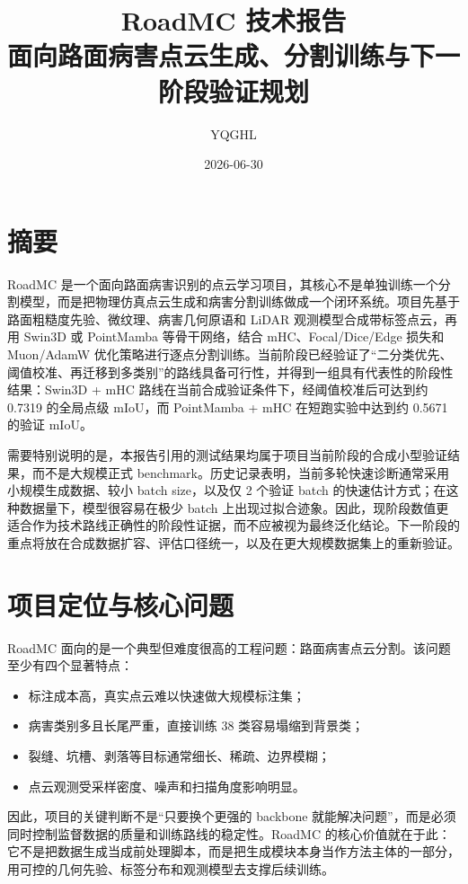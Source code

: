 \documentclass[12pt]{ctexart}
\title{\textbf{RoadMC 技术报告}\\
\large 面向路面病害点云生成、分割训练与下一阶段验证规划}
\author{YQGHL}
\date{2026-06-30}
\begin{document}
\maketitle

\section*{摘要}

RoadMC 是一个面向路面病害识别的点云学习项目，其核心不是单独训练一个分割模型，而是把物理仿真点云生成和病害分割训练做成一个闭环系统。项目先基于路面粗糙度先验、微纹理、病害几何原语和 LiDAR 观测模型合成带标签点云，再用 Swin3D 或 PointMamba 等骨干网络，结合 mHC、Focal/Dice/Edge 损失和 Muon/AdamW 优化策略进行逐点分割训练。当前阶段已经验证了“二分类优先、阈值校准、再迁移到多类别”的路线具备可行性，并得到一组具有代表性的阶段性结果：Swin3D + mHC 路线在当前合成验证条件下，经阈值校准后可达到约 0.7319 的全局点级 mIoU，而 PointMamba + mHC 在短跑实验中达到约 0.5671 的验证 mIoU。

需要特别说明的是，本报告引用的测试结果均属于项目当前阶段的合成小型验证结果，而不是大规模正式 benchmark。历史记录表明，当前多轮快速诊断通常采用小规模生成数据、较小 batch size，以及仅 2 个验证 batch 的快速估计方式；在这种数据量下，模型很容易在极少 batch 上出现过拟合迹象。因此，现阶段数值更适合作为技术路线正确性的阶段性证据，而不应被视为最终泛化结论。下一阶段的重点将放在合成数据扩容、评估口径统一，以及在更大规模数据集上的重新验证。

\section{项目定位与核心问题}

RoadMC 面向的是一个典型但难度很高的工程问题：路面病害点云分割。该问题至少有四个显著特点：

\begin{itemize}
  \item 标注成本高，真实点云难以快速做大规模标注集；
  \item 病害类别多且长尾严重，直接训练 38 类容易塌缩到背景类；
  \item 裂缝、坑槽、剥落等目标通常细长、稀疏、边界模糊；
  \item 点云观测受采样密度、噪声和扫描角度影响明显。
\end{itemize}

因此，项目的关键判断不是“只要换个更强的 backbone 就能解决问题”，而是必须同时控制监督数据的质量和训练路线的稳定性。RoadMC 的核心价值就在于此：它不是把数据生成当成前处理脚本，而是把生成模块本身当作方法主体的一部分，用可控的几何先验、标签分布和观测模型去支撑后续训练。
\end{document}
